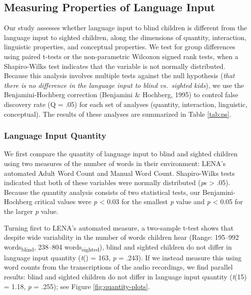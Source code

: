 \documentclass[
  man]{apa6}
\begin{document}
\hypertarget{measuring-properties-of-language-input}{%
\subsection{Measuring Properties of Language Input}\label{measuring-properties-of-language-input}}

Our study assesses whether language input to blind children is different from the language input to sighted children, along the dimensions of quantity, interaction, linguistic properties, and conceptual properties. We test for group differences using paired t-tests or the non-parametric Wilcoxon signed rank tests, when a Shapiro-Wilks test indicates that the variable is not normally distributed. Because this analysis involves multiple tests against the null hypothesis (\emph{that there is no difference in the language input to blind vs.~sighted kids}), we use the Benjamini-Hochberg correction (Benjamini \& Hochberg, 1995) to control false discovery rate (Q = .05) for each set of analyses (quantity, interaction, linguistic, conceptual). The results of these analyses are summarized in Table \ref{tab:ps}.

\hypertarget{language-input-quantity}{%
\subsubsection{Language Input Quantity}\label{language-input-quantity}}

We first compare the quantity of language input to blind and sighted children using two measures of the number of words in their environment: LENA's automated Adult Word Count and Manual Word Count. Shapiro-Wilks tests indicated that both of these variables were normally distributed (\emph{p}s \textgreater{} .05). Because the quantity analysis consists of two statistical tests, our Benjamini-Hochberg critical values were \emph{p} \textless{} 0.03 for the smallest \emph{p} value and \emph{p} \textless{} 0.05 for the larger \emph{p} value.

Turning first to LENA's automated measure, a two-sample t-test shows that despite wide variability in the number of words children hear (Range: 195--992 words\textsubscript{blind}, 238--804 words\textsubscript{sighted}), blind and sighted children do not differ in language input quantity (\emph{t}() = 163, \emph{p} = .243). If we instead measure this using word counts from the transcriptions of the audio recordings, we find parallel results: blind and sighted children do not differ in language input quantity (\emph{t}(15) = 1.18, \emph{p} = .255); see Figure \ref{fig:quantity-plots}.
\end{document}

